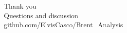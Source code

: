 \documentclass[aspectratio=169,11pt]{beamer}
\newcommand{\smalltext}[1]{{\footnotesize\textcolor{muted}{#1}}}
\begin{document}
{
\begin{frame}[plain]
  \vfill
  \begin{center}
    {\Large Thank you}\\[1em]
    {\normalsize Questions and discussion}\\[2em]
    \smalltext{github.com/ElvisCasco/Brent\_Analysis}
  \end{center}
  \vfill
\end{frame}
}

\appendix
\end{document}
